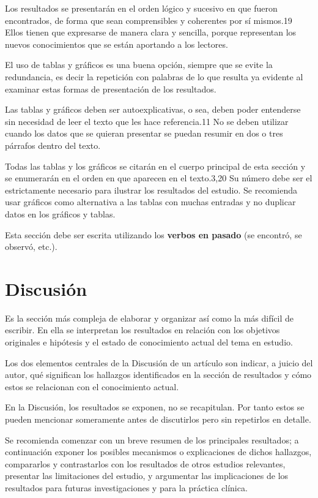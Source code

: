 \documentclass[%
 reprint,
groupedaddress,
unsortedaddress,
 amsmath,amssymb,
 aps,
superscriptaddress
]{revtex4-2}
\begin{document}
Los resultados se presentarán en el orden lógico y sucesivo en que fueron encontrados, de 
forma que sean comprensibles y coherentes por sí mismos.19 Ellos tienen que expresarse de 
manera clara y sencilla, porque representan los nuevos conocimientos que se están 
aportando a los lectores.

El uso de tablas y gráficos es una buena opción, siempre que se evite la redundancia, es 
decir la repetición con palabras de lo que resulta ya evidente al examinar estas formas 
de presentación de los resultados.

Las tablas y gráficos deben ser autoexplicativas, o sea, deben poder entenderse sin 
necesidad de leer el texto que les hace referencia.11 No se deben utilizar cuando los 
datos que se quieran presentar se puedan resumir en dos o tres párrafos dentro del 
texto.

Todas las tablas y los gráficos se citarán en el cuerpo principal de esta sección y se 
enumerarán en el orden en que aparecen en el texto.3,20 Su número debe ser el 
estrictamente necesario para ilustrar los resultados del estudio. Se recomienda usar 
gráficos como alternativa a las tablas con muchas entradas y no duplicar datos en los 
gráficos y tablas.

Esta sección debe ser escrita utilizando los \textbf{verbos en pasado} (se encontró, se 
observó, 
etc.).
\section{Discusión}
\label{Sec:Disc}

Es la sección más compleja de elaborar y organizar así como la más difícil de escribir. 
En ella se interpretan los resultados en relación con los objetivos originales e 
hipótesis y el estado de conocimiento actual del tema en estudio.

Los dos elementos centrales de la Discusión de un artículo son indicar, a juicio del 
autor, qué significan los hallazgos identificados en la sección de resultados y cómo 
estos se relacionan con el conocimiento actual.

En la Discusión, los resultados se exponen, no se recapitulan. Por tanto estos se pueden 
mencionar someramente antes de discutirlos pero sin repetirlos en detalle.

Se recomienda comenzar con un breve resumen de los principales resultados; a continuación 
exponer los posibles mecanismos o explicaciones de dichos hallazgos, compararlos y 
contrastarlos con los resultados de otros estudios relevantes, presentar las limitaciones 
del estudio, y argumentar las implicaciones de los resultados para futuras 
investigaciones y para la práctica clínica.
\end{document}
